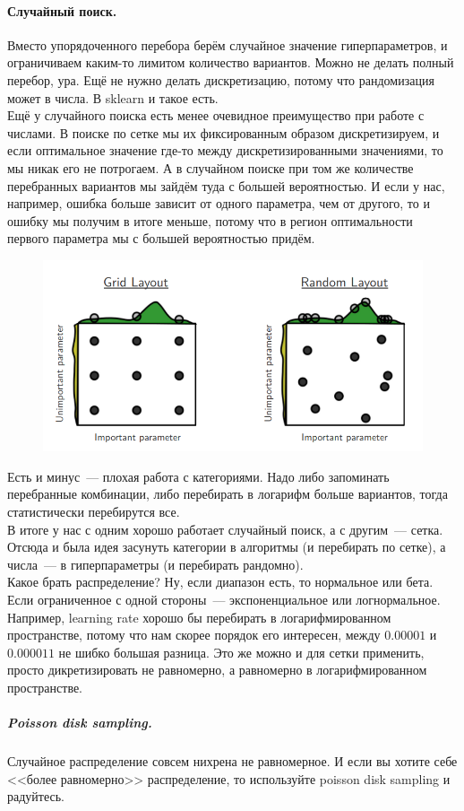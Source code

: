 \documentclass{article}
\begin{document}
    \paragraph{Случайный поиск.}
    Вместо упорядоченного перебора берём случайное значение гиперпараметров, и ограничиваем каким-то лимитом количество вариантов. Можно не делать полный перебор, ура. Ещё не нужно делать дискретизацию, потому что рандомизация может в числа. В sklearn и такое есть.\\
    Ещё у случайного поиска есть менее очевидное преимущество при работе с числами. В поиске по сетке мы их фиксированным образом дискретизируем, и если оптимальное значение где-то между дискретизированными значениями, то мы никак его не потрогаем. А в случайном поиске при том же количестве перебранных вариантов мы зайдём туда с большей вероятностью. И если у нас, например, ошибка больше зависит от одного параметра, чем от другого, то и ошибку мы получим в итоге меньше, потому что в регион оптимальности первого параметра мы с большей вероятностью придём.
    \begin{figure}[H]
        \includegraphics[width=0.75\linewidth]{Images/Random-vs-grid-layout}
    \end{figure}\noindent
    Есть и минус~--- плохая работа с категориями. Надо либо запоминать перебранные комбинации, либо перебирать в логарифм больше вариантов, тогда статистически перебирутся все.\\
    В итоге у нас с одним хорошо работает случайный поиск, а с другим~--- сетка. Отсюда и была идея засунуть категории в алгоритмы (и перебирать по сетке), а числа~--- в гиперпараметры (и перебирать рандомно).\\
    Какое брать распределение? Ну, если диапазон есть, то нормальное или бета. Если ограниченное с одной стороны~--- экспоненциальное или логнормальное. Например, learning rate хорошо бы перебирать в логарифмированном пространстве, потому что нам скорее порядок его интересен, между $0.00001$ и $0.000011$ не шибко большая разница. Это же можно и для сетки применить, просто дикретизировать не равномерно, а равномерно в логарифмированном пространстве.
    \subparagraph{Poisson disk sampling.}
    Случайное распределение совсем нихрена не равномерное. И если вы хотите себе <<более равномерно>> распределение, то используйте poisson disk sampling и радуйтесь.
\end{document}
